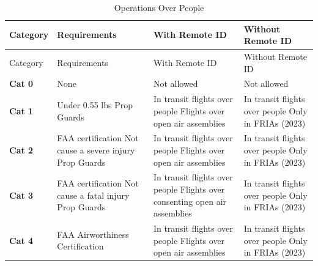 \documentclass[
  12pt,
]{book}
\begin{document}
\begin{longtable}[]{@{}
  >{\raggedleft\arraybackslash}p{}
  >{\centering\arraybackslash}p{}
  >{\centering\arraybackslash}p{}
  >{\centering\arraybackslash}p{}@{}}
\caption{\label{tab:OOPS} Operations Over People}\tabularnewline
\toprule\noalign{}
\begin{minipage}[b]{\linewidth}\raggedleft
Category
\end{minipage} & \begin{minipage}[b]{\linewidth}\centering
Requirements
\end{minipage} & \begin{minipage}[b]{\linewidth}\centering
With Remote ID
\end{minipage} & \begin{minipage}[b]{\linewidth}\centering
Without Remote ID
\end{minipage} \\
\midrule\noalign{}
\endfirsthead
\toprule\noalign{}
\begin{minipage}[b]{\linewidth}\raggedleft
Category
\end{minipage} & \begin{minipage}[b]{\linewidth}\centering
Requirements
\end{minipage} & \begin{minipage}[b]{\linewidth}\centering
With Remote ID
\end{minipage} & \begin{minipage}[b]{\linewidth}\centering
Without Remote ID
\end{minipage} \\
\midrule\noalign{}
\endhead
\bottomrule\noalign{}
\endlastfoot
\textbf{Cat 0} & None & Not allowed & Not allowed \\
\textbf{Cat 1} & Under 0.55 lbs Prop Guards & In transit flights over people Flights over open air assemblies & In transit flights over people Only in FRIAs (2023) \\
\textbf{Cat 2} & FAA certification Not cause a severe injury Prop Guards & In transit flights over people Flights over open air assemblies & In transit flights over people Only in FRIAs (2023) \\
\textbf{Cat 3} & FAA certification Not cause a fatal injury Prop Guards & In transit flights over people Flights over consenting open air assemblies & In transit flights over people Only in FRIAs (2023) \\
\textbf{Cat 4} & FAA Airworthiness Certification & In transit flights over people Flights over open air assemblies & In transit flights over people Only in FRIAs (2023) \\
\end{longtable}
\end{document}
